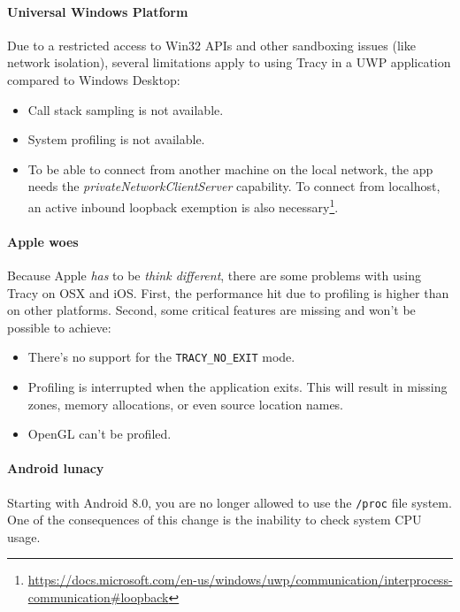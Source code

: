 \documentclass[hidelinks,titlepage,a4paper,twoside]{article}
\begin{document}
\paragraph{Universal Windows Platform}

Due to a restricted access to Win32 APIs and other sandboxing issues (like network isolation), several limitations apply to using Tracy in a UWP application compared to Windows Desktop:

\begin{itemize}
\item Call stack sampling is not available.
\item System profiling is not available.
\item To be able to connect from another machine on the local network, the app needs the \emph{privateNetworkClientServer} capability. To connect from localhost, an active inbound loopback exemption is also necessary\footnote{\url{https://docs.microsoft.com/en-us/windows/uwp/communication/interprocess-communication\#loopback}}.
\end{itemize}

\paragraph{Apple woes}

Because Apple \emph{has} to be \emph{think different}, there are some problems with using Tracy on OSX and iOS. First, the performance hit due to profiling is higher than on other platforms. Second, some critical features are missing and won't be possible to achieve:

\begin{itemize}
\item There's no support for the \texttt{TRACY\_NO\_EXIT} mode.
\item Profiling is interrupted when the application exits. This will result in missing zones, memory allocations, or even source location names.
\item OpenGL can't be profiled.
\end{itemize}

\paragraph{Android lunacy}
\label{androidlunacy}

Starting with Android 8.0, you are no longer allowed to use the \texttt{/proc} file system. One of the consequences of this change is the inability to check system CPU usage.
\end{document}
